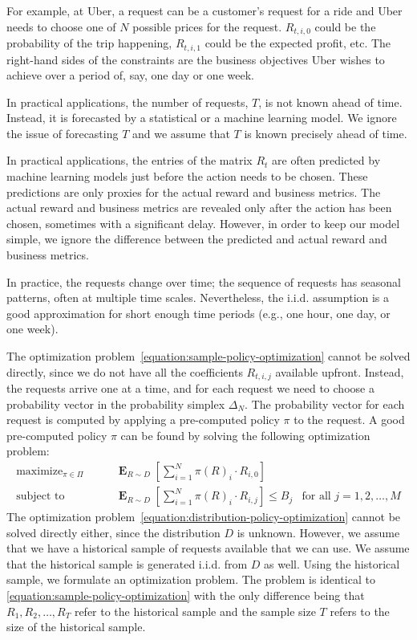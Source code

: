 \documentclass[12pt]{article}
\DeclareMathOperator*{\Exp}{\mathbf{E}}
\DeclareMathOperator*{\maximize}{maximize}
\DeclareMathOperator*{\subjectto}{subject\ to}
\theoremstyle{definition}
\begin{document}
For example, at Uber, a request can be a customer's request for a ride and Uber
needs to choose one of $N$ possible prices for the request. $R_{t,i,0}$ could be
the probability of the trip happening, $R_{t,i,1}$ could be the expected profit,
etc. The right-hand sides of the constraints are the business objectives Uber
wishes to achieve over a period of, say, one day or one week.

In practical applications, the number of requests, $T$, is not known ahead of time.
Instead, it is forecasted by a statistical or a machine learning model. We
ignore the issue of forecasting $T$ and we assume that $T$ is known precisely
ahead of time.

In practical applications, the entries of the matrix $R_t$ are often predicted
by machine learning models just before the action needs to be chosen. These
predictions are only proxies for the actual reward and business metrics. The
actual reward and business metrics are revealed only after the action has been
chosen, sometimes with a significant delay. However, in order to keep our model
simple, we ignore the difference between the predicted and actual reward and
business metrics.

In practice, the requests change over time; the sequence of requests has
seasonal patterns, often at multiple time scales. Nevertheless, the i.i.d.
assumption is a good approximation for short enough time periods (e.g., one
hour, one day, or one week).

The optimization problem~\eqref{equation:sample-policy-optimization} cannot be
solved directly, since we do not have all the coefficients $R_{t,i,j}$ available
upfront. Instead, the requests arrive one at a time, and for each request we
need to choose a probability vector in the probability simplex $\Delta_N$. The
probability vector for each request is computed by applying a pre-computed
policy $\pi$ to the request. A good pre-computed policy $\pi$ can be found by
solving the following optimization problem:
\begin{equation}
\label{equation:distribution-policy-optimization}
\begin{aligned}
\maximize_{\pi \in \Pi} \qquad & \Exp_{R \sim D} \left[ \sum_{i=1}^N \pi(R)_i \cdot R_{i,0} \right] \\
\subjectto \qquad & \Exp_{R \sim D} \left[ \sum_{i=1}^N \pi(R)_i \cdot R_{i,j} \right] \le B_j & \text{for all $j=1,2,\dots,M$}
\end{aligned}
\end{equation}
The optimization problem~\eqref{equation:distribution-policy-optimization}
cannot be solved directly either, since the distribution $D$ is unknown.
However, we assume that we have a historical sample of requests available that
we can use. We assume that the historical sample is generated i.i.d. from $D$ as
well. Using the historical sample, we formulate an optimization problem. The
problem is identical to \eqref{equation:sample-policy-optimization} with the
only difference being that $R_1, R_2, \dots, R_T$ refer to the historical
sample and the sample size $T$ refers to the size of the historical sample.
\end{document}
